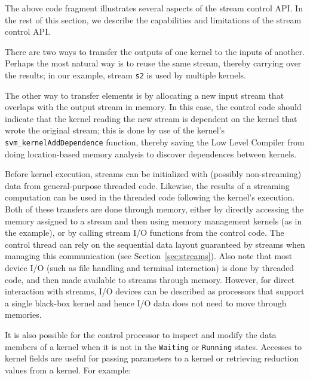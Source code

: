 The above code fragment illustrates several aspects of the stream
control API.  In the rest of this section, we describe the
capabilities and limitations of the stream control API.


There are two ways to transfer the outputs of one kernel to the inputs
of another.  Perhaps the most natural way is to reuse the same stream,
thereby carrying over the results; in our example, stream {\tt s2} is
used by multiple kernels.

The other way to transfer elements is by allocating a new input stream
that overlaps with the output stream in memory.  In this case, the
control code should indicate that the kernel reading the new stream is
dependent on the kernel that wrote the original stream; this is done
by use of the kernel's {\tt svm\_kernelAddDependence} function, thereby
saving the Low Level Compiler from doing location-based memory
analysis to discover dependences between kernels.


Before kernel execution, streams can be initialized with (possibly
non-streaming) data from general-purpose threaded code.  Likewise, the
results of a streaming computation can be used in the threaded code
following the kernel's execution.  Both of these transfers are done
through memory, either by directly accessing the memory assigned to a
stream and then using memory management kernels (as in the example),
or by calling stream I/O functions from the control code.  The control
thread can rely on the sequential data layout guaranteed by streams
when managing this communication (see Section~\ref{sec:streams}).
Also note that most device I/O (such as file handling and terminal
interaction) is done by threaded code, and then made available to
streams through memory.  However, for direct interaction with streams,
I/O devices can be described as processors that support a single
black-box kernel and hence I/O data does not need to move through
memories.

It is also possible for the control processor to inspect and modify
the data members of a kernel when it is not in the {\tt Waiting} or
{\tt Running} states. Accesses to kernel fields are useful for passing
parameters to a kernel or retrieving reduction values from a kernel.
For example:

